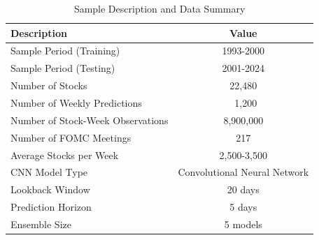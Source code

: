 \begin{table}
\caption{Sample Description and Data Summary}
\label{tab:sample_stats}
\begin{tabular}{lc}
\toprule
Description & Value \\
\midrule
Sample Period (Training) & 1993-2000 \\
Sample Period (Testing) & 2001-2024 \\
Number of Stocks & 22,480 \\
Number of Weekly Predictions & ~1,200 \\
Number of Stock-Week Observations & 8,900,000 \\
Number of FOMC Meetings & 217 \\
Average Stocks per Week & 2,500-3,500 \\
CNN Model Type & Convolutional Neural Network \\
Lookback Window & 20 days \\
Prediction Horizon & 5 days \\
Ensemble Size & 5 models \\
\bottomrule
\end{tabular}
\end{table}
